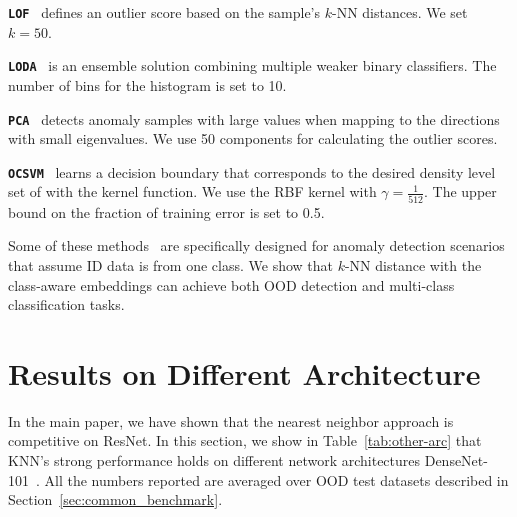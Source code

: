 \documentclass[nohyperref]{article}
\newcommand{\method}{{KNN}}
\theoremstyle{plain}
\theoremstyle{definition}
\theoremstyle{remark}
\begin{document}
\texttt{\textbf{LOF}}~\citep{breunig2000lof} defines an outlier score based on the sample’s $k$-NN distances. We set $k=50$. 

\texttt{\textbf{LODA}}~\citep{2016loda} is an ensemble solution combining multiple weaker binary classifiers. The number of bins for the histogram is set to 10. 

\texttt{\textbf{PCA}}~\citep{shyu2003pca} detects anomaly samples with large values when mapping to the directions with small eigenvalues. We use 50 components for calculating the outlier scores. 

\texttt{\textbf{OCSVM}}~\citep{bernhard2001ocsvm} learns a decision
boundary that corresponds to the desired density level set
of with the kernel function. We use the RBF kernel with $\gamma=\frac{1}{512}$. The upper bound on the fraction of training error is set to 0.5. 


Some of these methods~\citep{bernhard2001ocsvm, shyu2003pca} are specifically designed for anomaly detection scenarios that assume ID data is from one class. We show that $k$-NN distance with the class-aware embeddings can achieve both OOD detection and multi-class classification tasks. 





\section{Results on Different Architecture}
\label{sec:other_arc}
In the main paper, we have shown that the nearest neighbor approach is competitive on ResNet. In this section, we show in Table~\ref{tab:other-arc} that \method's strong performance holds on different network architectures DenseNet-101~\citep{huang2017densely}. All the numbers reported are averaged over OOD test datasets described in Section~\ref{sec:common_benchmark}. 

 
 
\end{document}
